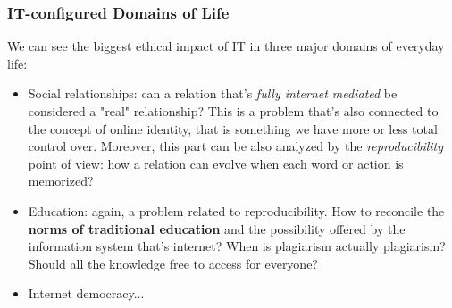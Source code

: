 \documentclass{article}
\begin{document}
		\subsubsection{IT-configured Domains of Life}
			We can see the biggest ethical impact of IT in three major domains of everyday life:
			\begin{itemize}
				\item Social relationships: can a relation that's \textit{fully internet mediated} be considered a "real" relationship? This is a problem that's also connected to the concept of online identity, that is something we have more or less total control over. Moreover, this part can be also analyzed by the \textit{reproducibility} point of view: how a relation can evolve when each word or action is memorized?
		 		\item Education: again, a problem related to reproducibility. How to reconcile the \textbf{norms of traditional education} and the possibility offered by the information system that's internet? When is plagiarism actually plagiarism? Should all the knowledge free to access for everyone?
				\item Internet democracy...
			\end{itemize}
\end{document}
